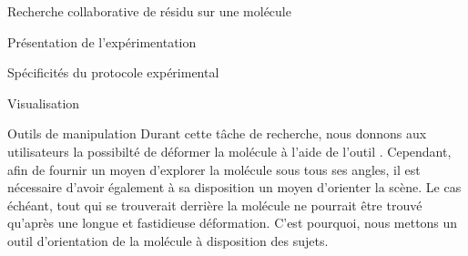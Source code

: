 \documentclass[myfrancais,ngerman,english,frenchb]{mythesis}
\begin{document}
\begin{mychapter}{Recherche collaborative de résidu sur une molécule}
\begin{mysection}{Présentation de l'expérimentation}
\begin{mysubsection}{Spécificités du protocole expérimental}
\begin{mysubsubsection}{Visualisation}
					\begin{myfigure}
					\end{myfigure}
				\end{mysubsubsection}
				\begin{mysubsubsection}{Outils de manipulation}
					Durant cette tâche de recherche, nous donnons aux utilisateurs la possibilté de déformer la molécule à l'aide de l'outil .
					Cependant, afin de fournir un moyen d'explorer la molécule sous tous ses angles, il est nécessaire d'avoir également à sa disposition un moyen d'orienter la scène.
					Le cas échéant, tout  qui se trouverait derrière la molécule ne pourrait être trouvé qu'après une longue et fastidieuse déformation.
					C'est pourquoi, nous mettons un outil d'orientation de la molécule à disposition des sujets.


\end{mysubsubsection}
\end{mysubsection}
\end{mysection}
\end{mychapter}
\end{document}
